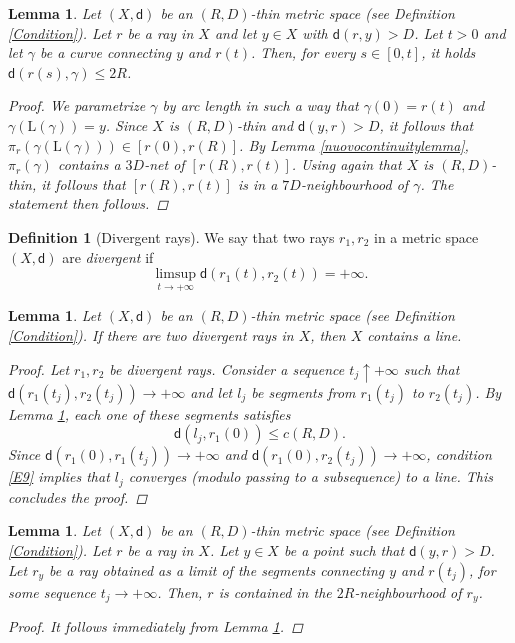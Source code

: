\documentclass[10pt]{article}
\newtheorem{lemma}[thm]{Lemma}
\theoremstyle{definition}
\newtheorem{definition}[thm]{Definition}
\newcommand{\length}{\mathrm{L}}
\newcommand{\sd}{\mathsf{d}}
\begin{document}
\begin{lemma} \label{L|alternative connectedness}
    Let $(X,\sd)$ be an $(R,D)$-thin metric space (see Definition \ref{Condition}).
    Let $r$ be a ray in $X$ and let $y \in X$ with $\sd(r,y)>D$. Let $t>0$ and let $\gamma$ be a curve connecting $y$ and $r(t)$. Then, for every $s \in [0,t]$, it holds $\sd(r(s),\gamma) \leq 2R$. 
    \begin{proof} 
We parametrize $\gamma$ by arc length in such a way that $\gamma(0)=r(t)$ and $\gamma(\length(\gamma))=y$. Since $X$ is $(R,D)$-thin and $\sd(y,r)>D$, it follows that $\pi_r(\gamma(\length(\gamma))) \in [r(0),r(R)]$. By Lemma \ref{nuovocontinuitylemma}, $\pi_r(\gamma)$ contains a $3D$-net of $[r(R),r(t)]$. Using again that $X$ is $(R,D)$-thin, it follows that $[r(R),r(t)]$ is in a $7D$-neighbourhood of $\gamma$. The statement then follows.
    \end{proof}
\end{lemma}


\begin{definition}[Divergent rays]
    We say that two rays $r_1,r_2$ in a metric space $(X,\sd)$ are \emph{divergent} if 
   \[
   \limsup_{t \to + \infty} \sd(r_1(t),r_2(t))=+\infty.
   \]
\end{definition}

\begin{lemma} \label{L5}
  Let $(X,\sd)$ be an $(R,D)$-thin metric space (see Definition \ref{Condition}).
     If there are two divergent rays in $X$, then $X$ contains a line.
    \begin{proof}
       Let $r_1,r_2$ be divergent rays. 
        Consider a sequence $t_j \uparrow + \infty$ such that $\sd(r_1(t_j),r_2(t_j)) \to + \infty$ and let $l_j$ be segments from $r_1(t_j)$ to $r_2(t_j)$. 
        By Lemma \ref{L|alternative connectedness}, each one of these segments satisfies
        \begin{equation} \label{E9}
        \sd(l_j,r_1(0)) \leq c(R,D).
        \end{equation}
        Since $\sd(r_1(0),r_1(t_j)) \to + \infty$ and $\sd(r_1(0),r_2(t_j)) \to + \infty$, condition \eqref{E9} implies that $l_j$ converges (modulo passing to a subsequence) to a line. This concludes the proof.
    \end{proof}
\end{lemma}

\begin{lemma} \label{L4}
Let $(X,\sd)$ be an $(R,D)$-thin metric space (see Definition \ref{Condition}).
     Let $r$ be a ray in $X$. Let $y \in X$ be a point such that $\sd(y,r)>D$. Let $r_y$ be a ray obtained as a limit of the segments connecting $y$ and $r(t_j)$, for some sequence  $t_j \to + \infty$. Then, $r$ is contained in the  $2R$-neighbourhood of $r_y$.
     \begin{proof}
         It follows immediately from Lemma \ref{L|alternative connectedness}.
     \end{proof}
\end{lemma}
\end{document}
